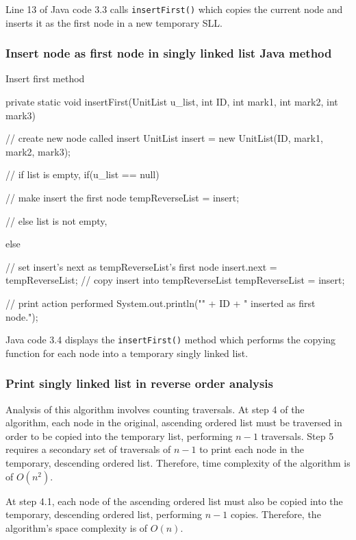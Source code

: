 \noindent
Line 13 of Java code 3.3 calls \texttt{insertFirst()} which copies the current node and inserts it as the first node in a new temporary SLL.

\subsubsection{Insert node as first node in singly linked list Java method}

\begin{listing}[H]
\caption{Insert first method}
\begin{javacode}
private static void insertFirst(UnitList u_list, int ID, int mark1, int mark2, int mark3) {

    // create new node called insert
    UnitList insert = new UnitList(ID, mark1, mark2, mark3);

    // if list is empty,
    if(u_list == null) {

        // make insert the first node
        tempReverseList = insert;

    // else list is not empty,
    } else {

        // set insert's next as tempReverseList's first node
        insert.next = tempReverseList;
        // copy insert into tempReverseList
        tempReverseList = insert;
    }

    // print action performed
    System.out.println("\nStudent " + ID + " inserted as first node.");
}
\end{javacode}
\end{listing}

\noindent
Java code 3.4 displays the \texttt{insertFirst()} method which performs the copying function for each node into a temporary singly linked list.

\subsubsection{Print singly linked list in reverse order analysis}

Analysis of this algorithm involves counting traversals. At step 4 of the algorithm, each node in the original, ascending ordered list must be traversed in order to be copied into the temporary list, performing $n - 1$ traversals. Step 5 requires a secondary set of traversals of $n - 1$ to print each node in the temporary, descending ordered list. Therefore, time complexity of the algorithm is of $O(n^2)$.

At step 4.1, each node of the ascending ordered list must also be copied into the temporary, descending ordered list, performing $n - 1$ copies. Therefore, the algorithm's space complexity is of $O(n)$.

